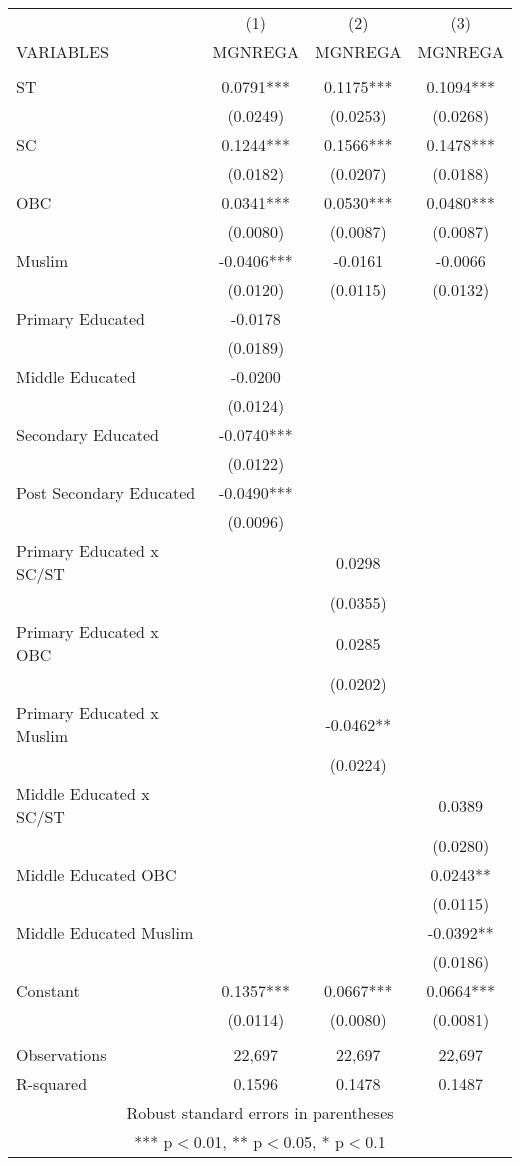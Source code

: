 \documentclass[]{article}
\begin{document}
\begin{tabular}{lccc} \hline
 & (1) & (2) & (3) \\
VARIABLES & MGNREGA & MGNREGA & MGNREGA \\ \hline
 &  &  &  \\
ST & 0.0791*** & 0.1175*** & 0.1094*** \\
 & (0.0249) & (0.0253) & (0.0268) \\
SC & 0.1244*** & 0.1566*** & 0.1478*** \\
 & (0.0182) & (0.0207) & (0.0188) \\
OBC & 0.0341*** & 0.0530*** & 0.0480*** \\
 & (0.0080) & (0.0087) & (0.0087) \\
Muslim & -0.0406*** & -0.0161 & -0.0066 \\
 & (0.0120) & (0.0115) & (0.0132) \\
Primary Educated & -0.0178 &  &  \\
 & (0.0189) &  &  \\
Middle Educated & -0.0200 &  &  \\
 & (0.0124) &  &  \\
Secondary Educated & -0.0740*** &  &  \\
 & (0.0122) &  &  \\
Post Secondary Educated & -0.0490*** &  &  \\
 & (0.0096) &  &  \\
Primary Educated x SC/ST &  & 0.0298 &  \\
 &  & (0.0355) &  \\
Primary Educated x OBC &  & 0.0285 &  \\
 &  & (0.0202) &  \\
Primary Educated x Muslim &  & -0.0462** &  \\
 &  & (0.0224) &  \\
Middle Educated x SC/ST &  &  & 0.0389 \\
 &  &  & (0.0280) \\
Middle Educated OBC &  &  & 0.0243** \\
 &  &  & (0.0115) \\
Middle Educated Muslim &  &  & -0.0392** \\
 &  &  & (0.0186) \\
Constant & 0.1357*** & 0.0667*** & 0.0664*** \\
 & (0.0114) & (0.0080) & (0.0081) \\
 &  &  &  \\
Observations & 22,697 & 22,697 & 22,697 \\
 R-squared & 0.1596 & 0.1478 & 0.1487 \\ \hline
\multicolumn{4}{c}{ Robust standard errors in parentheses} \\
\multicolumn{4}{c}{ *** p$<$0.01, ** p$<$0.05, * p$<$0.1} \\
\end{tabular}
\end{document}
